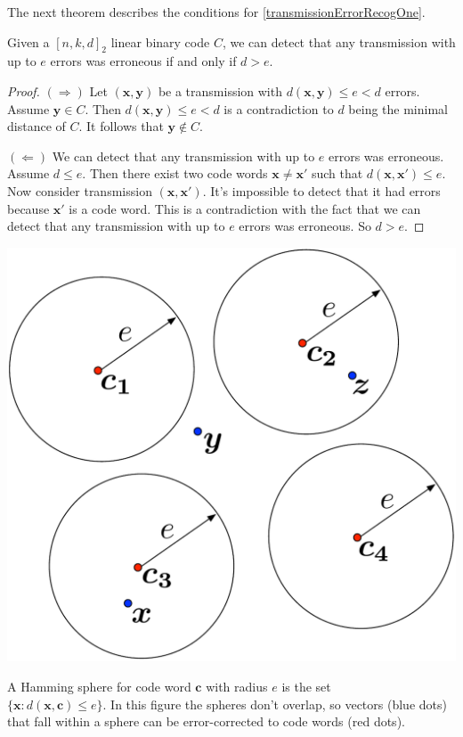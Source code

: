 The next theorem describes the conditions for \ref{transmissionErrorRecogOne}.

\begin{thm}\label{linearCodeDetectErrors}
Given a $[n, k, d]_2$ linear binary code $C$, we can detect that any transmission with up to $e$ errors was erroneous if and only if $d > e$.
\end{thm}

\begin{proof}

\noindent$(\Rightarrow)$ Let $(\bm{x}, \bm{y})$ be a transmission with $d(\bm{x}, \bm{y}) \leq e < d$ errors. Assume $\bm{y} \in C$. Then $d(\bm{x}, \bm{y}) \leq e < d$ is a contradiction to $d$ being the minimal distance of $C$. It follows that $\bm{y} \notin C$.

\noindent$(\Leftarrow)$ We can detect that any transmission with up to $e$ errors was erroneous. Assume $d \leq e$. Then there exist two code words $\bm{x} \neq \bm{x'}$ such that $d(\bm{x}, \bm{x'}) \leq e$. Now consider transmission $(\bm{x}, \bm{x'})$. It's impossible to detect that it had errors because $\bm{x'}$ is a code word. This is a contradiction with the fact that we can detect that any transmission with up to $e$ errors was erroneous. So $d > e$.
\end{proof}

\begin{marginfigure}[0.5in]
\includegraphics[scale=0.3]{hammingSpheres.pdf}
\caption{A Hamming sphere for code word $\bm{c}$ with radius  $e$ is the set \\
$\{\bm{x}: d(\bm{x}, \bm{c}) \leq e\}$. In this figure the spheres don't overlap, so vectors (blue dots) that fall within a sphere can be error-corrected to code words (red dots).}
\label{fig:hammingSpheres}
\end{marginfigure}


